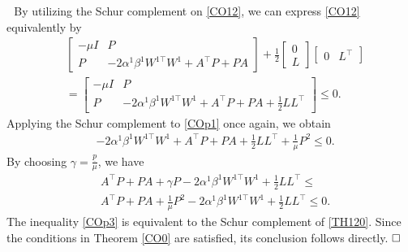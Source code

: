 \documentclass[journal,twoside,web]{ieeecolor}
\renewenvironment{proof}{\vspace{.1cm}\noindent{\sc Proof.}\hspace{0.10cm}\,\,}{$\hfill\Box$\vspace{.1cm}}
\begin{document}
\begin{proof}
By utilizing the Schur complement on \eqref{CO12}, we can express \eqref{CO12} equivalently by   
\begin{equation}\label{COp1}
\begin{aligned}
&\begin{bmatrix}
-\mu I&P\\P&-2\alpha^1\beta^1W^{1\top}W^1+A^\top P+PA
\end{bmatrix}+\frac{1}{2}\begin{bmatrix}
0\\L
\end{bmatrix}\begin{bmatrix}
0&L^\top
\end{bmatrix}\\&=\begin{bmatrix}
-\mu I&P\\P&-2\alpha^1\beta^1W^{1\top}W^1+A^\top P+PA+\frac{1}{2}LL^{\top}
\end{bmatrix}\leq 0.
\end{aligned}
\end{equation}
Applying the Schur complement to \eqref{COp1} once again, we obtain
\begin{equation}\label{COp2}
\begin{aligned}
&-2\alpha^1\beta^1W^{1\top}W^1+A^\top P+PA+\frac{1}{2}LL^{\top}+\frac{1}{\mu}P^2\leq 0.
\end{aligned}
\end{equation}
By choosing $\gamma=\frac{\underline{p}}{\mu}$, we have
\begin{equation}\label{COp3}
\begin{aligned}
&A^\top P+PA+\gamma P-2\alpha^1\beta^1W^{1\top}W^1+\frac{1}{2}LL^{\top}\leq\\&A^\top P+PA+\frac{1}{\mu}P^2-2\alpha^1\beta^1W^{1\top}W^1+\frac{1}{2}LL^{\top}\leq 0.
\end{aligned}
\end{equation}
The inequality \eqref{COp3} is equivalent to the Schur complement of \eqref{TH120}. Since the conditions in Theorem \ref{CO0} are satisfied, its conclusion follows directly.
\end{proof}
\end{document}
